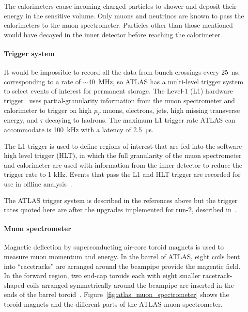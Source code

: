 The calorimeters cause incoming charged particles to shower and deposit their energy in the sensitive volume. Only muons and neutrinos are known to pass the calorimeters to the muon spectrometer.  Particles other than those mentioned would have decayed in the inner detector before reaching the calorimeter. 

\paragraph*{Trigger system} \hfill \break
It would be impossible to record all the data from bunch crossings every \SI{25}{\nano\second}, corresponding to a rate of $\sim$\SI{40}{MHz}, so ATLAS has a multi-level trigger system to select events of interest for permanent storage. The Level-1 (L1) hardware trigger~\cite{atlas_l1_trigger_tdr} uses partial-granularity information from the muon spectrometer and calorimeter to trigger on high $p_T$ muons, electrons, jets, high missing transverse energy, and $\tau$ decaying to hadrons. The maximum L1 trigger rate ATLAS can accommodate is \SI{100}{kHz} with a latency of \SI{2.5}{\micro\second}. 


The L1 trigger is used to define regions of interest that are fed into the software high level trigger (HLT), in which the full granularity of the muon spectrometer and calorimeter are used with information from the inner detector to reduce the trigger rate to 1 kHz. Events that pass the L1 and HLT trigger are recorded for use in offline analysis~\cite{atlas_hlt_trigger_tdr}.

The ATLAS trigger system is described in the references above but the trigger rates quoted here are after the upgrades implemented for run-2, described in~\cite{martinez_run-2_2016}.

\paragraph*{Muon spectrometer} \hfill \break
Magnetic deflection by superconducting air-core toroid magnets is used to measure muon momentum and energy. In the barrel of ATLAS, eight coils bent into ``racetracks'' are arranged around the beampipe provide the magentic field. In the forward region, two end-cap toroids each with eight smaller racetrack-shaped coils arranged symmetrically around the beampipe are inserted in the ends of the barrel toroid~\cite{atlas_magnet_tdr}. Figure~\ref{fig:atlas_muon_spectrometer} shows the toroid magnets and the different parts of the ATLAS muon spectrometer.

